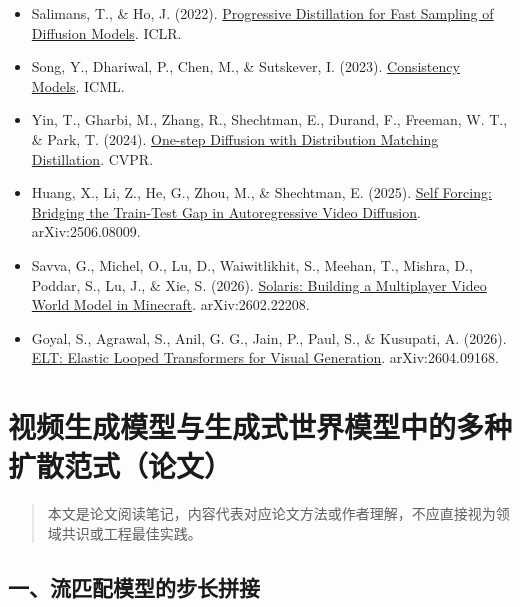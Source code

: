 \begin{itemize}
\tightlist
\item
  Salimans, T., \& Ho, J. (2022). \href{https://arxiv.org/abs/2202.00512}{Progressive Distillation for Fast Sampling of Diffusion Models}. ICLR.
\item
  Song, Y., Dhariwal, P., Chen, M., \& Sutskever, I. (2023). \href{https://arxiv.org/abs/2303.01469}{Consistency Models}. ICML.
\item
  Yin, T., Gharbi, M., Zhang, R., Shechtman, E., Durand, F., Freeman, W. T., \& Park, T. (2024). \href{https://arxiv.org/abs/2311.18828}{One-step Diffusion with Distribution Matching Distillation}. CVPR.
\item
  Huang, X., Li, Z., He, G., Zhou, M., \& Shechtman, E. (2025). \href{https://arxiv.org/abs/2506.08009}{Self Forcing: Bridging the Train-Test Gap in Autoregressive Video Diffusion}. arXiv:2506.08009.
\item
  Savva, G., Michel, O., Lu, D., Waiwitlikhit, S., Meehan, T., Mishra, D., Poddar, S., Lu, J., \& Xie, S. (2026). \href{https://arxiv.org/abs/2602.22208}{Solaris: Building a Multiplayer Video World Model in Minecraft}. arXiv:2602.22208.
\item
  Goyal, S., Agrawal, S., Anil, G. G., Jain, P., Paul, S., \& Kusupati, A. (2026). \href{https://arxiv.org/abs/2604.09168}{ELT: Elastic Looped Transformers for Visual Generation}. arXiv:2604.09168.
\end{itemize}

\clearpage

\hypertarget{ux89c6ux9891ux751fux6210ux6a21ux578bux4e0eux751fux6210ux5f0fux4e16ux754cux6a21ux578bux4e2dux7684ux591aux79cdux6269ux6563ux8303ux5f0fux8bbaux6587}{%
\section{视频生成模型与生成式世界模型中的多种扩散范式（论文）}\label{ux89c6ux9891ux751fux6210ux6a21ux578bux4e0eux751fux6210ux5f0fux4e16ux754cux6a21ux578bux4e2dux7684ux591aux79cdux6269ux6563ux8303ux5f0fux8bbaux6587}}

\begin{quote}
本文是论文阅读笔记，内容代表对应论文方法或作者理解，不应直接视为领域共识或工程最佳实践。
\end{quote}

\hypertarget{ux4e00ux6d41ux5339ux914dux6a21ux578bux7684ux6b65ux957fux62fcux63a5}{%
\subsection{一、流匹配模型的步长拼接}\label{ux4e00ux6d41ux5339ux914dux6a21ux578bux7684ux6b65ux957fux62fcux63a5}}

